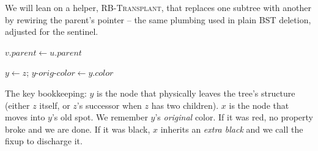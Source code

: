 We will lean on a helper, \textsc{RB-Transplant}, that replaces one subtree with
another by rewiring the parent's pointer -- the same plumbing used in plain BST
deletion, adjusted for the sentinel.

\begin{algorithm}[H]
\caption{\textsc{RB-Transplant}$(T, u, v)$}
$v.\mathit{parent} \gets u.\mathit{parent}$\;
\end{algorithm}

\begin{algorithm}[H]
\caption{\textsc{RB-Delete}$(T, z)$}
$y \gets z$; \quad $y\text{-}orig\text{-}color \gets y.\mathit{color}$\;
\end{algorithm}

\begin{focusbox}
The key bookkeeping: $y$ is the node that physically leaves the tree's structure
(either $z$ itself, or $z$'s successor when $z$ has two children). $x$ is the node
that moves into $y$'s old spot. We remember $y$'s \emph{original} color. If it was
red, no property broke and we are done. If it was black, $x$ inherits an
\emph{extra black} and we call the fixup to discharge it.
\end{focusbox}

